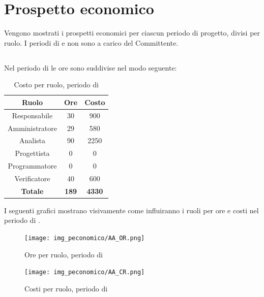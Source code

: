 \section{Prospetto economico}
Vengono mostrati i prospetti economici per ciascun periodo di progetto, divisi per ruolo. I periodi di \AR{} e \AD{} non sono a carico del Committente.

\subsection{\AR}
Nel periodo di \AR{} le ore sono suddivise nel modo seguente:
\begin{table}[H]
	\centering
	\begin{tabular}{|c|c|c|}
		\hline
		\textbf{Ruolo} &
		\textbf{Ore} &
		\textbf{Costo} \\
		\hline
		Responsabile & 30 & 900\\
		\hline
		Amministratore & 29 & 580\\
		\hline
		Analista & 90 & 2250\\
		\hline
		Progettista & 0 & 0 \\
		\hline
		Programmatore & 0 & 0 \\
		\hline
		Verificatore & 40 & 600\\
		\hline
		\textbf{Totale} & \textbf{189} & \textbf{4330} \\
		\hline
	\end{tabular}
	\caption{Costo per ruolo, periodo di \AR}
\end{table}

I seguenti grafici mostrano visivamente come influiranno i ruoli per ore e costi nel periodo di \AR.
\begin{figure}[H]
	\centering
	\texttt{[image: img\_peconomico/AA\_OR.png]}
	\caption{Ore per ruolo, periodo di \AR}
\end{figure}
\begin{figure}[H]
	\centering
	\texttt{[image: img\_peconomico/AA\_CR.png]}
	\caption{Costi per ruolo, periodo di \AR}
\end{figure}

